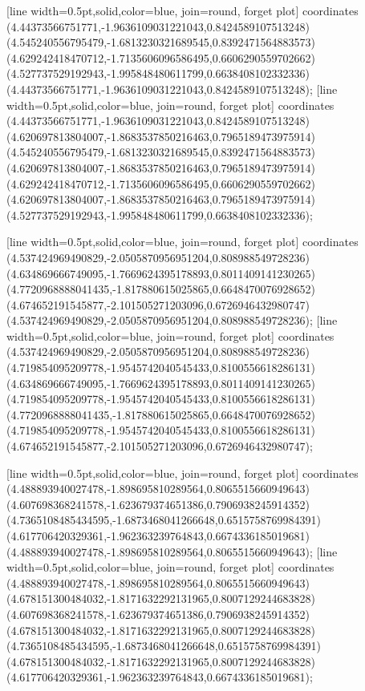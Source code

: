 [line width=0.5pt,solid,color=blue, join=round, forget plot] coordinates {(4.44373566751771,-1.9636109031221043,0.8424589107513248) (4.545240556795479,-1.6813230321689545,0.8392471564883573) (4.629242418470712,-1.7135606096586495,0.6606290559702662) (4.527737529192943,-1.995848480611799,0.6638408102332336) (4.44373566751771,-1.9636109031221043,0.8424589107513248)};
[line width=0.5pt,solid,color=blue, join=round, forget plot] coordinates {(4.44373566751771,-1.9636109031221043,0.8424589107513248) (4.620697813804007,-1.8683537850216463,0.7965189473975914) (4.545240556795479,-1.6813230321689545,0.8392471564883573) (4.620697813804007,-1.8683537850216463,0.7965189473975914) (4.629242418470712,-1.7135606096586495,0.6606290559702662) (4.620697813804007,-1.8683537850216463,0.7965189473975914) (4.527737529192943,-1.995848480611799,0.6638408102332336)};

[line width=0.5pt,solid,color=blue, join=round, forget plot] coordinates {(4.537424969490829,-2.0505870956951204,0.808988549728236) (4.634869666749095,-1.7669624395178893,0.8011409141230265) (4.7720968888041435,-1.817880615025865,0.6648470076928652) (4.674652191545877,-2.101505271203096,0.6726946432980747) (4.537424969490829,-2.0505870956951204,0.808988549728236)};
[line width=0.5pt,solid,color=blue, join=round, forget plot] coordinates {(4.537424969490829,-2.0505870956951204,0.808988549728236) (4.719854095209778,-1.9545742040545433,0.8100556618286131) (4.634869666749095,-1.7669624395178893,0.8011409141230265) (4.719854095209778,-1.9545742040545433,0.8100556618286131) (4.7720968888041435,-1.817880615025865,0.6648470076928652) (4.719854095209778,-1.9545742040545433,0.8100556618286131) (4.674652191545877,-2.101505271203096,0.6726946432980747)};

[line width=0.5pt,solid,color=blue, join=round, forget plot] coordinates {(4.488893940027478,-1.898695810289564,0.8065515660949643) (4.607698368241578,-1.623679374651386,0.7906938245914352) (4.7365108485434595,-1.6873468041266648,0.6515758769984391) (4.617706420329361,-1.962363239764843,0.6674336185019681) (4.488893940027478,-1.898695810289564,0.8065515660949643)};
[line width=0.5pt,solid,color=blue, join=round, forget plot] coordinates {(4.488893940027478,-1.898695810289564,0.8065515660949643) (4.678151300484032,-1.8171632292131965,0.8007129244683828) (4.607698368241578,-1.623679374651386,0.7906938245914352) (4.678151300484032,-1.8171632292131965,0.8007129244683828) (4.7365108485434595,-1.6873468041266648,0.6515758769984391) (4.678151300484032,-1.8171632292131965,0.8007129244683828) (4.617706420329361,-1.962363239764843,0.6674336185019681)};

